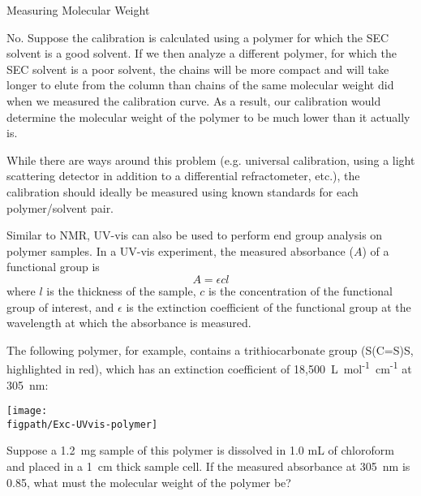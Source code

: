 \begin{activity}{Measuring Molecular Weight}
\begin{ctqs}
			\begin{solution}[1.5in]
				No.  Suppose the calibration is calculated using a polymer for which the SEC solvent is a good solvent.  If we then analyze a different polymer, for which the SEC solvent is a poor solvent, the chains will be more compact and will take longer to elute from the column than chains of the same molecular weight did when we measured the calibration curve.  As a result, our calibration would determine the molecular weight of the polymer to be much lower than it actually is.
				
				While there are ways around this problem (e.g. universal calibration, using a light scattering detector in addition to a differential refractometer, etc.), the calibration should ideally be measured using known standards for each polymer/solvent pair.
			\end{solution}
	
	
	
\end{ctqs}


\begin{exercises}

	\exercise Similar to NMR, UV-vis can also be used to perform end group analysis on polymer samples.  In a UV-vis experiment, the measured absorbance ($A$) of a functional group is
		\begin{equation*}
			A = \epsilon c l
		\end{equation*}
		where $l$ is the thickness of the sample, $c$ is the concentration of the functional group of interest, and $\epsilon$ is the extinction coefficient of the functional group at the wavelength at which the absorbance is measured.
		
		The following polymer, for example, contains a trithiocarbonate group (S(C=S)S,  highlighted in red), which has an extinction coefficient of 18,500~L~mol\textsuperscript{-1}~cm\textsuperscript{-1} at 305~nm:
		
			\centerline{\texttt{[image: \\figpath/Exc-UVvis-polymer]}}
		
		Suppose a 1.2~mg sample of this polymer is dissolved in 1.0 mL of chloroform and placed in a 1~cm thick sample cell.  If the measured absorbance at 305~nm is 0.85, what must the molecular weight of the polymer be?
		

\end{exercises}
\end{activity}
